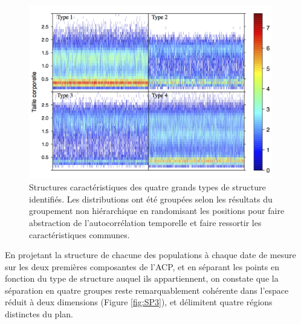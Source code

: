 \begin{figure}[!ht]
\begin{center}
\includegraphics[width=0.95\textwidth]{1_CorpsDeThese/Resumes/Fig/SP02c}
\caption[Quatres grands
types de structures]{Structures caractéristiques des quatre grands types de
structure identifiés. Les distributions ont été groupées selon les résultats du
groupement non hiérarchique en randomisant les positions pour faire abstraction
de l'autocorrélation temporelle et faire ressortir les caractéristiques
communes.}
\label{fig:SP3a}
\end{center}
\end{figure}

En projetant la structure de chacune des populations à chaque date de mesure
sur les deux premières composantes de l'ACP, et en séparant les points en
fonction du type de structure auquel ils appartiennent, on constate que la
séparation en quatre groupes reste remarquablement cohérente dans l'espace
réduit à deux dimensions (Figure \ref{fig:SP3}), et délimitent quatre régions
distinctes du plan.

